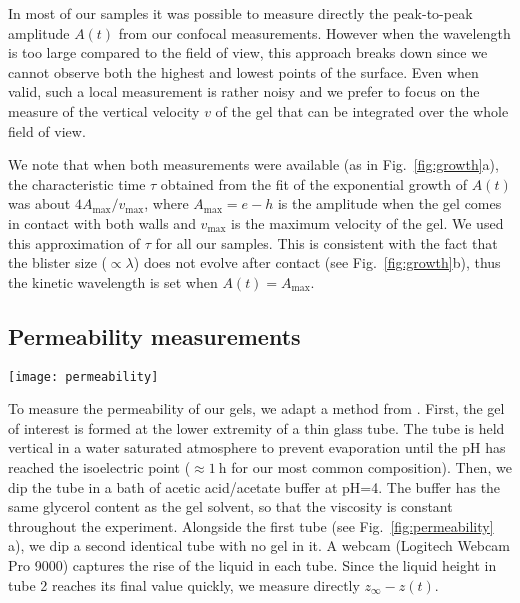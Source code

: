\documentclass[twocolumn,superscriptaddress,showpacs,preprintnumbers,
amsmath,amssymb,prl]{revtex4-1}
\begin{document}
In most of our samples it was possible to measure directly the peak-to-peak amplitude $A(t)$ from our confocal measurements. However when the wavelength is too large compared to the field of view, this approach breaks down since we cannot observe both the highest and lowest points of the surface. Even when valid, such a local measurement is rather noisy and we prefer to focus on the measure of the vertical velocity $v$ of the gel that can be integrated over the whole field of view.

We note that when both measurements were available (as in Fig.~\ref{fig:growth}a), the characteristic time $\tau$ obtained from the fit of the exponential growth of $A(t)$ was about $4A_\text{max}/v_\text{max}$, where $A_\text{max} = e-h$ is the amplitude when the gel comes in contact with both walls and $v_\text{max}$ is the maximum velocity of the gel. We used this approximation of $\tau$ for all our samples. This is consistent with the fact that the blister size ($\propto\lambda$) does not evolve after contact (see Fig.~\ref{fig:growth}b), thus the kinetic wavelength is set when $A(t) = A_\text{max}$.

\subsection*{Permeability measurements}
\begin{figure*}
	\texttt{[image: permeability]}
	\caption{Permeability measurements. (a) Schematic representation of the experiment. (b-c) Evolution of the height of the interface in tube 1 relative to the final height in tube 2. Black line is the best exponential fit $Ae^{-t/\tau}$. (b) Gel is 4\%w casein, 4\%w GDL in water, $H=\SI{2.3}{\milli\metre}$ and $\tau=\SI{57}{\minute}$. (c) Same as (b) for a 50\%w glycerol--water mixture, $H=\SI{4}{\milli\metre}$ and $\tau=\SI{100}{\hour}$.}
	\label{fig:permeability}
\end{figure*}

To measure the permeability of our gels, we adapt a method from \cite{VanDijk1986}. First, the gel of interest is formed at the lower extremity of a thin glass tube. The tube is held vertical in a water saturated atmosphere to prevent evaporation until the pH has reached the isoelectric point ($\approx\SI{1}{\hour}$ for our most common composition). Then, we dip the tube in a bath of acetic acid/acetate buffer at pH=4. The buffer has the same glycerol content as the gel solvent, so that the viscosity is constant throughout the experiment. Alongside the first tube (see Fig.~\ref{fig:permeability} a), we dip a second identical tube with no gel in it. A webcam (Logitech Webcam Pro 9000) captures the rise of the liquid in each tube. Since the liquid height in tube 2 reaches its final value quickly, we measure directly $z_\infty-z(t)$.
\end{document}

